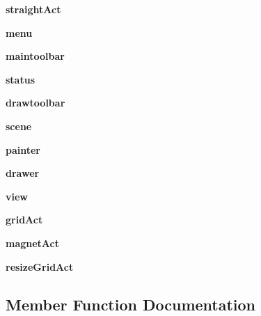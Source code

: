 \begin{DoxyCompactItemize}
{\bfseries straight\+Act}
\item 
\mbox{\label{classInterface_1_1Window_a271d5eb885c8fce33701db11c32b9627}} 
{\bfseries menu}
\item 
\mbox{\label{classInterface_1_1Window_a0686c2922720d593d6409c65af67841f}} 
{\bfseries maintoolbar}
\item 
\mbox{\label{classInterface_1_1Window_abe5fdb7b44bb0dcf8af95074868ee152}} 
{\bfseries status}
\item 
\mbox{\label{classInterface_1_1Window_aff5d02f284f5567eca907919441e0958}} 
{\bfseries drawtoolbar}
\item 
\mbox{\label{classInterface_1_1Window_ab2e1e2fe52f229d576dd6dbe9a7fd247}} 
{\bfseries scene}
\item 
\mbox{\label{classInterface_1_1Window_a44862e89ef3f4ea3e88296213c999148}} 
{\bfseries painter}
\item 
\mbox{\label{classInterface_1_1Window_a72b3508a0c91f4d7b6ac1e48be10053d}} 
{\bfseries drawer}
\item 
\mbox{\label{classInterface_1_1Window_a44ab20cbcd4efe456188710745335655}} 
{\bfseries view}
\item 
\mbox{\label{classInterface_1_1Window_ad99550f6bcc8c6ce09fbd836639cc060}} 
{\bfseries grid\+Act}
\item 
\mbox{\label{classInterface_1_1Window_a3f4b09eb3a3041b9b455a5213a63da6c}} 
{\bfseries magnet\+Act}
\item 
\mbox{\label{classInterface_1_1Window_af6491c26aaca88194a1e5d9427a2cfc1}} 
{\bfseries resize\+Grid\+Act}
\end{DoxyCompactItemize}


\subsection{Member Function Documentation}
\mbox{\label{classInterface_1_1Window_a911f0d3daed537c92e5ce12eeb675d5b}} 
